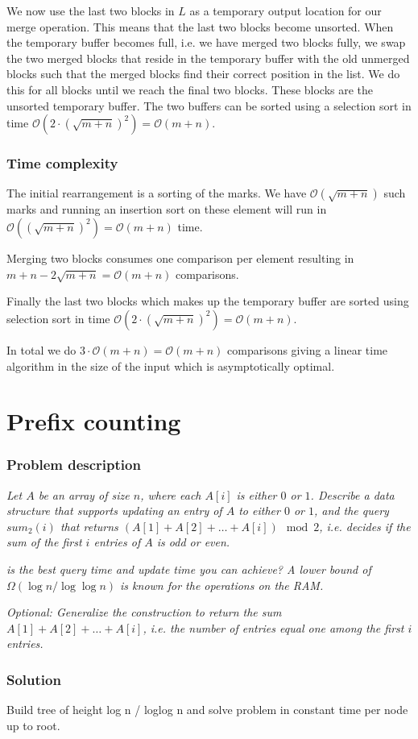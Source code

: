 \documentclass[a4paper,oneside,article,11pt]{memoir}
\begin{document}
We now use the last two blocks in $L$ as a temporary output location for our merge operation. This means that the last two blocks become unsorted. When the temporary buffer becomes full, i.e. we have merged two blocks fully, we swap the two merged blocks that reside in the temporary buffer with the old unmerged blocks such that the merged blocks find their correct position in the list. We do this for all blocks until we reach the final two blocks. These blocks are the unsorted temporary buffer. The two buffers can be sorted using a selection sort in time $\mathcal{O}(2\cdot\left(\sqrt{m+n}\right)^2) = \mathcal{O}(m+n)$.

\subsection{Time complexity}
The initial rearrangement is a sorting of the marks. We have $\mathcal{O}(\sqrt{m+n})$ such marks and running an insertion sort on these element will run in $\mathcal{O}( (\sqrt{m+n})^2) = \mathcal{O}(m+n)$ time.

Merging two blocks consumes one comparison per element resulting in $m+n - 2\sqrt{m+n} = \mathcal{O}(m+n)$ comparisons.

Finally the last two blocks which makes up the temporary buffer are sorted using selection sort in time $\mathcal{O}(2\cdot\left(\sqrt{m+n}\right)^2) = \mathcal{O}(m+n)$.

In total we do $3\cdot\mathcal{O}(m+n) = \mathcal{O}(m+n)$ comparisons giving a linear time algorithm in the size of the input which is asymptotically optimal.

\chapter{Prefix counting}
\label{chp:prefix}
\subsection{Problem description}
\textit{Let $A$ be an array of size $n$, where each $A\left[i\right]$ is either $0$ or $1$. Describe a data structure that supports updating an entry of $A$ to either $0$ or $1$, and the query $sum_2\left(i\right)$ that returns $\left(A\left[1\right]+A\left[2\right]+\dots+A\left[i\right]\right) \mod 2$, i.e. decides if the sum of the first $i$ entries of $A$ is odd or even.}

\textit{ is the best query time and update time you can achieve? A lower bound of $\Omega(\log n/\log\log n)$ is known for the operations on the RAM.}

\textit{Optional: Generalize the construction to return the sum $A[1]+A[2]+\dots+A[i]$, i.e. the number of entries equal one among the first $i$ entries.}

\subsection{Solution}
Build tree of height log n / loglog n and solve problem in constant time per node up to root.


\end{document}
